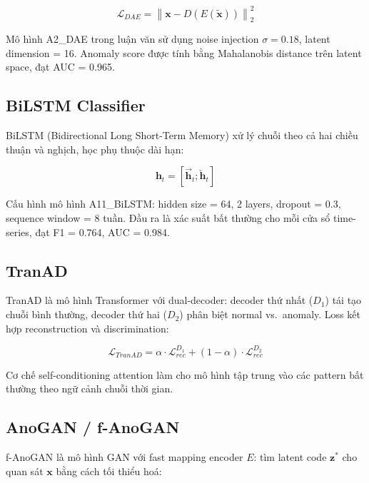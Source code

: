\begin{equation}
  \mathcal{L}_{DAE} = \left\| \mathbf{x} - D(E(\tilde{\mathbf{x}})) \right\|_2^2
  \label{eq:dae}
\end{equation}

Mô hình A2\_DAE trong luận văn sử dụng noise injection $\sigma = 0.18$, latent dimension = 16. Anomaly score được tính bằng Mahalanobis distance trên latent space, đạt AUC = 0.965.

\subsection{BiLSTM Classifier}

BiLSTM (Bidirectional Long Short-Term Memory) \cite{graves2005bilstm} xử lý chuỗi theo cả hai chiều thuận và nghịch, học phụ thuộc dài hạn:

\begin{equation}
  \mathbf{h}_t = [\overrightarrow{\mathbf{h}}_t; \overleftarrow{\mathbf{h}}_t]
  \label{eq:bilstm}
\end{equation}

Cấu hình mô hình A11\_BiLSTM: hidden size = 64, 2 layers, dropout = 0.3, sequence window = 8 tuần. Đầu ra là xác suất bất thường cho mỗi cửa sổ time-series, đạt F1 = 0.764, AUC = 0.984.

\subsection{TranAD}

TranAD \cite{tuli2022tranad} là mô hình Transformer với dual-decoder: decoder thứ nhất ($D_1$) tái tạo chuỗi bình thường, decoder thứ hai ($D_2$) phân biệt normal vs.\ anomaly. Loss kết hợp reconstruction và discrimination:

\begin{equation}
  \mathcal{L}_{TranAD} = \alpha \cdot \mathcal{L}_{rec}^{D_1} + (1-\alpha) \cdot \mathcal{L}_{rec}^{D_2}
  \label{eq:tranad}
\end{equation}

Cơ chế self-conditioning attention làm cho mô hình tập trung vào các pattern bất thường theo ngữ cảnh chuỗi thời gian.

\subsection{AnoGAN / f-AnoGAN}

f-AnoGAN \cite{schlegl2019anogan} là mô hình GAN với fast mapping encoder $E$: tìm latent code $\mathbf{z}^*$ cho quan sát $\mathbf{x}$ bằng cách tối thiểu hoá:

